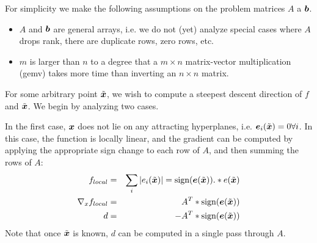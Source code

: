 For simplicity we make the following assumptions on the problem matrices $A$ a $\boldsymbol{b}$.
\begin{itemize}
\item $A$ and $\boldsymbol{b}$ are general arrays, i.e. we do not (yet) analyze special cases
where $A$ drops rank, there are duplicate rows, zero rows, etc.
\item $m$ is larger than $n$ to a degree that a $m \times n$ matrix-vector multiplication (gemv)
takes more time than inverting an $n\times n$ matrix.  
\end{itemize}

For some arbitrary point $\tilde{{\boldsymbol{x}}}$, we wish to compute a steepest descent
direction of $f$ and $\tilde{{\boldsymbol{x}}}$.  We begin by analyzing two cases.

In the first case, ${\boldsymbol{x}}$ does not lie on any attracting hyperplanes, i.e. $\boldsymbol{e}_i(\tilde{{\boldsymbol{x}}})=0
\forall i$. In this case, the function is locally linear, and the gradient can be computed
by applying the appropriate sign change to each row of $A$, and then summing the rows of $A$:
\begin{eqnarray}
f_{local} &=& \sum_i |e_i(\tilde{{\boldsymbol{x}}})| = {\text{sign}}(\boldsymbol{e}(\tilde{{\boldsymbol{x}}})) .* e(\tilde{{\boldsymbol{x}}}) \\
\nabla_x f_{local} &=& A^T * {\text{sign}}(\boldsymbol{e}(\tilde{{\boldsymbol{x}}})) \\
d &=& -A^T * {\text{sign}}(\boldsymbol{e}(\tilde{{\boldsymbol{x}}}))
\end{eqnarray}
Note that once $\tilde{{\boldsymbol{x}}}$ is known, $d$ can be computed in a single pass through $A$.

